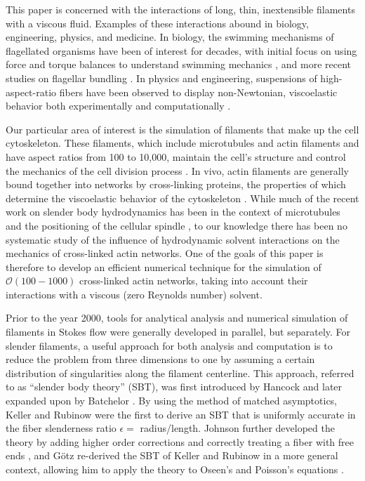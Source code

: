 This paper is concerned with the interactions of long, thin, inextensible filaments with a viscous fluid. Examples of these interactions abound in biology, engineering, physics, and medicine. In biology, the swimming mechanisms of flagellated organisms have been of interest for decades, with initial focus on using force and torque balances to understand swimming mechanics \cite{chwang1971note, berg1973bacteria, brennen1977fluid, lauga2009hydrodynamics}, and more recent studies on flagellar bundling \cite{lim2012fluid, maier2016magnetic}. In physics and engineering, suspensions of high-aspect-ratio fibers have been observed to display non-Newtonian, viscoelastic behavior both experimentally \cite{fibexps} and computationally \cite{mackfibs, kochsumfig}. 

Our particular area of interest is the simulation of filaments that make up the cell cytoskeleton. These filaments, which include microtubules and actin filaments and have aspect ratios from 100 to 10,000, maintain the cell's structure and control the mechanics of the cell division process \cite{alberts}. In vivo, actin filaments are generally bound together into networks by cross-linking proteins, the properties of which determine the viscoelastic behavior of the cytoskeleton \cite{wagner2006cytoskeletal, head2003deformation, ahmed2015dynamic}. While much of the recent work on slender body hydrodynamics has been in the context of microtubules and the positioning of the cellular spindle \cite{ehssan17, shelley2016dynamics}, to our knowledge there has been no systematic study of the influence of hydrodynamic solvent interactions on the mechanics of cross-linked actin networks. One of the goals of this paper is therefore to develop an efficient numerical technique for the simulation of $\mathcal{O}(100-1000)$ cross-linked actin networks, taking into account their interactions with a viscous (zero Reynolds number) solvent. 

Prior to the year 2000, tools for analytical analysis and numerical simulation of filaments in Stokes flow were generally developed in parallel, but separately. For slender filaments, a useful approach for both analysis and computation is to reduce the problem from three dimensions to one by assuming a certain distribution of singularities along the filament centerline. This approach, referred to as ``slender body theory'' (SBT), was first introduced by Hancock \cite{hancock1953self} and later expanded upon by Batchelor \cite{batchelor1970slender}. By using the method of matched asymptotics, Keller and Rubinow were the first to derive an SBT that is uniformly accurate in the fiber slenderness ratio $\epsilon = $ radius/length. Johnson further developed the theory by adding higher order corrections and correctly treating a fiber with free ends \cite{johnson}, and G\"otz re-derived the SBT of Keller and Rubinow in a more general context, allowing him to apply the theory to Oseen's and Poisson's equations \cite{gotz2001interactions}. 


